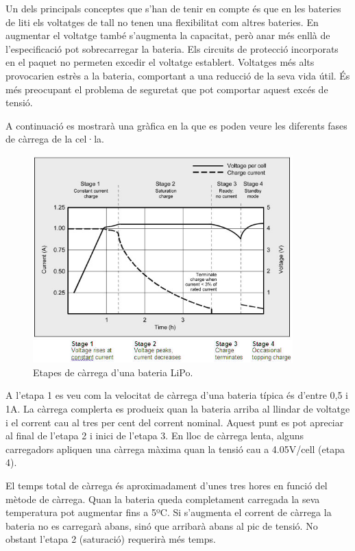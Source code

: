 Un dels principals conceptes que s'han de tenir en compte és que en les bateries de liti els voltatges de tall no tenen una flexibilitat com altres bateries. En augmentar el voltatge també s'augmenta la capacitat, però anar més enllà de l'especificació pot sobrecarregar la bateria. Els circuits de protecció incorporats en el paquet no permeten excedir el voltatge establert.
Voltatges més alts provocarien estrès a la bateria, comportant a una reducció de la seva vida útil. És més preocupant el problema de seguretat que pot comportar aquest excés de tensió.

A continuació es mostrarà una gràfica en la que es poden veure les diferents fases de càrrega de la cel·la.

\begin{figure}[H]
	\centering
    \includegraphics[width=\textwidth, height=8cm] {Bateries/cargabatlipo.jpg}
    \caption{Etapes de càrrega d'una bateria LiPo.}
\end{figure}

A l'etapa 1 es veu com la velocitat de càrrega d'una bateria típica és d'entre 0,5 i 1A. La càrrega complerta es produeix quan la bateria arriba al llindar de voltatge i el corrent cau al tres per cent del corrent nominal. Aquest punt es pot apreciar al final de l'etapa 2 i inici de l'etapa 3. En lloc de càrrega lenta, alguns carregadors apliquen una càrrega màxima quan la tensió cau a 4.05V/cell (etapa 4).

El temps total de càrrega és aproximadament d'unes tres hores en funció del mètode de càrrega. Quan la bateria queda completament carregada la seva temperatura pot augmentar fins a 5ºC. Si s'augmenta el corrent de càrrega la bateria no es carregarà abans, sinó que arribarà abans al pic de tensió. No obstant  l'etapa 2 (saturació) requerirà més temps.

